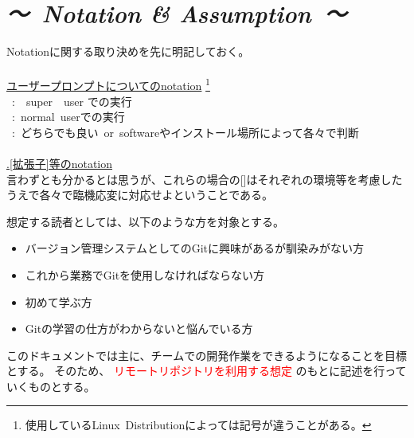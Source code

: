 \documentclass[11pt,a4paper,openany,dvipdfmx]{jsarticle}
\begin{document}
\section*{\it {～\ Notation }\rm{\&}\it{ Assumption\ ～}}
Notationに関する取り決めを先に明記しておく。
\\
\\
\underline{ユーザープロンプトについてのnotation}
\footnote{使用しているLinux\ Distributionによっては記号が違うことがある。}\\
\ :\ \ super\ \ user での実行\\
\ :\ normal\ userでの実行\\
\ :\ どちらでも良い\ or\ softwareやインストール場所によって各々で判断
\\
\\
\underline{.[拡張子]等のnotation}\\
言わずとも分かるとは思うが、これらの場合の[]はそれぞれの環境等を考慮したうえで各々で臨機応変に対応せよということである。\newline

想定する読者としては、以下のような方を対象とする。
\begin{itemize}
	\item バージョン管理システムとしてのGitに興味があるが馴染みがない方
	\item これから業務でGitを使用しなければならない方
	\item 初めて学ぶ方
	\item Gitの学習の仕方がわからないと悩んでいる方
\end{itemize}


このドキュメントでは主に、チームでの開発作業をできるようになることを目標とする。
そのため、\textcolor{red}{ リモートリポジトリを利用する想定 }のもとに記述を行っていくものとする。



\end{document}

